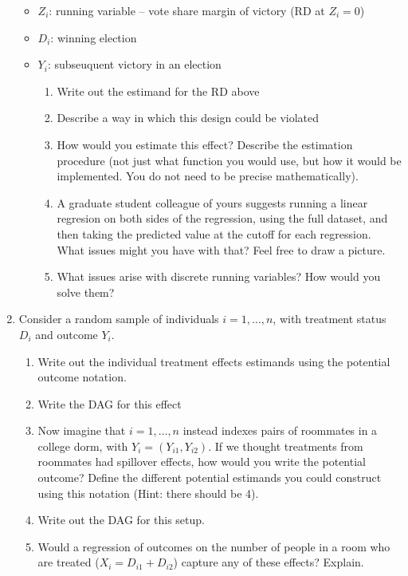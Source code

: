 \documentclass[11pt, a4paper]{article}
\begin{document}
\begin{enumerate}
  \begin{itemize}
  \item $Z_{i}$: running variable -- vote share margin of victory (RD at $Z_{i} = 0$)
  \item $D_{i}$: winning election
  \item $Y_{i}$: subseuquent victory in an election
    \begin{enumerate}
    \item Write out the estimand for the RD above
    \item Describe a way in which this design could be violated
    \item How would you estimate this effect? Describe the estimation
      procedure (not just what function you would use, but how it
      would be implemented. You do not need to be precise
      mathematically).
    \item A graduate student colleague of yours suggests running a
      linear regresion on both sides of the regression, using the full
      dataset, and then taking the predicted value at the cutoff for
      each regression. What issues might you have with that? Feel free
      to draw a picture.
    \item What issues arise with discrete running variables? How would
      you solve them?
    \end{enumerate}
  \end{itemize}
  \item Consider a random sample of individuals $i= 1, \ldots, n$,
    with treatment status $D_{i}$ and outcome $Y_{i}$.
    \begin{enumerate}
    \item Write out the individual treatment effects estimands using the potential outcome notation.
    \item Write the DAG for this effect
    \item Now imagine that $i= 1, \ldots, n$ instead indexes pairs of
      roommates in a college dorm, with $Y_{i} = (Y_{i1}, Y_{i2})$. If
      we thought treatments from roommates had spillover effects, how
      would you write the potential outcome? Define the different
      potential estimands you could construct using this notation
      (Hint: there should be 4).
    \item Write out the DAG for this setup.
    \item Would a regression of outcomes on the number of people in a
      room who are treated ($X_{i} = D_{i1} + D_{i2}$) capture any of
      these effects? Explain.

\end{enumerate}
\end{enumerate}
\end{document}
